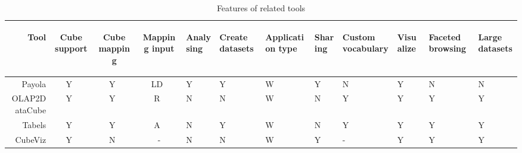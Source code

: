 \begin{table}[h]
  \caption{Features of related tools}
  \vspace{0.5cm}
  \label{tab:related-features}
\begin{tabularx}{\textwidth}{ |r|C|C|C|X|X|X|X|X|X|X|X| }
  \hline
      \begin{sideways}Tool\end{sideways} & 
      \centering\begin{sideways}Cube support\end{sideways} &
      \centering\begin{sideways}Cube mapping\end{sideways} &
      \centering\begin{sideways}Mapping input\end{sideways} &
      \centering\begin{sideways}Analysing\end{sideways} &
      \centering\begin{sideways}Create datasets\end{sideways} &
      \centering\begin{sideways}Application type\end{sideways} &
      \centering\begin{sideways}Sharing\end{sideways} &
      \centering\begin{sideways}Custom vocabulary\end{sideways} &
      \centering\begin{sideways}Visualize\end{sideways} &
      \centering\begin{sideways}Faceted browsing\end{sideways} &
      \begin{sideways}Large datasets\end{sideways}\\ \hline
  \hline
  Payola                   & Y~& Y~& LD~& Y~& Y~& W~& Y~& N~& Y~& N~& N~\\ \hline
  OLAP2DataCube    & Y~& Y~& R~ & N~& N~& W~& N~& Y~& Y~& Y~& Y~\\ \hline
  Tabels                   & Y~& Y~& A~ & N~& Y~& W~& N~& Y~& Y~& Y~& Y~\\ \hline
  CubeViz                & Y~& N~& -  & N~& N~& W~& Y~& - & Y~& Y~& Y~\\ \hline \hline 
  

\end{tabularx}
\end{table}
